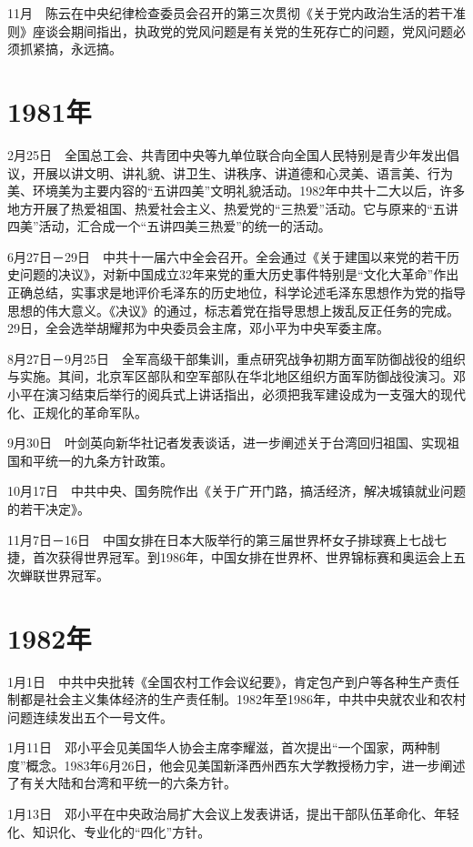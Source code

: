 \documentclass[10pt,a4paper,twocolumn]{book}
\begin{document}
11月　陈云在中央纪律检查委员会召开的第三次贯彻《关于党内政治生活的若干准则》座谈会期间指出，执政党的党风问题是有关党的生死存亡的问题，党风问题必须抓紧搞，永远搞。

\section{1981年}

2月25日　全国总工会、共青团中央等九单位联合向全国人民特别是青少年发出倡议，开展以讲文明、讲礼貌、讲卫生、讲秩序、讲道德和心灵美、语言美、行为美、环境美为主要内容的“五讲四美”文明礼貌活动。1982年中共十二大以后，许多地方开展了热爱祖国、热爱社会主义、热爱党的“三热爱”活动。它与原来的“五讲四美”活动，汇合成一个“五讲四美三热爱”的统一的活动。

6月27日－29日　中共十一届六中全会召开。全会通过《关于建国以来党的若干历史问题的决议》，对新中国成立32年来党的重大历史事件特别是“文化大革命”作出正确总结，实事求是地评价毛泽东的历史地位，科学论述毛泽东思想作为党的指导思想的伟大意义。《决议》的通过，标志着党在指导思想上拨乱反正任务的完成。29日，全会选举胡耀邦为中央委员会主席，邓小平为中央军委主席。

8月27日－9月25日　全军高级干部集训，重点研究战争初期方面军防御战役的组织与实施。其间，北京军区部队和空军部队在华北地区组织方面军防御战役演习。邓小平在演习结束后举行的阅兵式上讲话指出，必须把我军建设成为一支强大的现代化、正规化的革命军队。

9月30日　叶剑英向新华社记者发表谈话，进一步阐述关于台湾回归祖国、实现祖国和平统一的九条方针政策。

10月17日　中共中央、国务院作出《关于广开门路，搞活经济，解决城镇就业问题的若干决定》。

11月7日－16日　中国女排在日本大阪举行的第三届世界杯女子排球赛上七战七捷，首次获得世界冠军。到1986年，中国女排在世界杯、世界锦标赛和奥运会上五次蝉联世界冠军。

\section{1982年}

1月1日　中共中央批转《全国农村工作会议纪要》，肯定包产到户等各种生产责任制都是社会主义集体经济的生产责任制。1982年至1986年，中共中央就农业和农村问题连续发出五个一号文件。

1月11日　邓小平会见美国华人协会主席李耀滋，首次提出“一个国家，两种制度”概念。1983年6月26日，他会见美国新泽西州西东大学教授杨力宇，进一步阐述了有关大陆和台湾和平统一的六条方针。

1月13日　邓小平在中央政治局扩大会议上发表讲话，提出干部队伍革命化、年轻化、知识化、专业化的“四化”方针。
\end{document}
